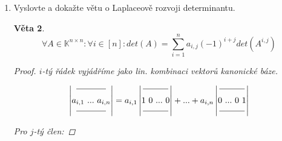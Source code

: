 \documentclass[10pt,a4paper]{article}
\theoremstyle{plain}
\newtheorem{veta}{Věta}
\begin{document}
\begin{enumerate}
\begin{veta}
\begin{proof}
\begin{enumerate}[label=(\alph*)]
Z těchto dvou lze odvodit zbylé dvě operace.

\hfill

Rozložíme regulární A na elementární matice $A = E_1E_2 ... E_k$:

\begin{align*}
det(AB) &= det(E_1E_2 ... E_kB) = det(E_1)det(E_2 ... E_kB) = ... = \\
&=  det(E_1)det(E_2) ... det(E_k)det(B) = det(E_1)det(E_2) ... det(E_{k-1}E_k)det(B) = ... = \\
&= det(E_1E_2 ... E_k)det(B) \\
&= det(A)det(B)
\end{align*}

\end{enumerate}
\end{proof}
\end{veta}

\item Vyslovte a dokažte větu o Laplaceově rozvoji determinantu.

\begin{veta}
\[ \forall A \in \mathbb{K}^{n \times n}: \forall i \in [n]: det(A) = \sum_{i=1}^n a_{i,j}(-1)^{i+j}det(A^{i,j})\]
\begin{proof}
$i$-tý řádek vyjádříme jako lin. kombinaci vektorů kanonické báze.

\[ \begin{vmatrix}
\rule[1ex]{3.5em}{0.4pt}\\
a_{i,1}\  ...\  a_{i,n} \\
\rule[.5ex]{3.5em}{0.4pt}
\end{vmatrix} =
a_{i,1}\begin{vmatrix}
\rule[1ex]{3em}{0.4pt}\\
1\ 0\ ...\ 0 \\
\rule[.5ex]{3em}{0.4pt}
\end{vmatrix} + ... + 
a_{i,n}\begin{vmatrix}
\rule[1ex]{3em}{0.4pt}\\
0\ ...\ 0\ 1 \\
\rule[.5ex]{3em}{0.4pt}
\end{vmatrix} \]

Pro $j$-tý člen:


\end{proof}
\end{veta}
\end{enumerate}
\end{document}
